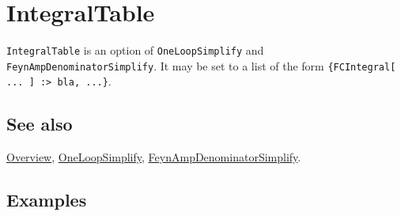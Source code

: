 \documentclass[../FeynCalcManual.tex]{subfiles}
\begin{document}
\hypertarget{integraltable}{
\section{IntegralTable}\label{integraltable}}

\texttt{IntegralTable} is an option of \texttt{OneLoopSimplify} and
\texttt{FeynAmpDenominatorSimplify}. It may be set to a list of the form
\texttt{\{\allowbreak{}FCIntegral[\allowbreak{} ... ] :> bla,\ \allowbreak{}...\}}.

\subsection{See also}

\hyperlink{toc}{Overview}, \hyperlink{oneloopsimplify}{OneLoopSimplify},
\hyperlink{feynampdenominatorsimplify}{FeynAmpDenominatorSimplify}.

\subsection{Examples}
\end{document}
